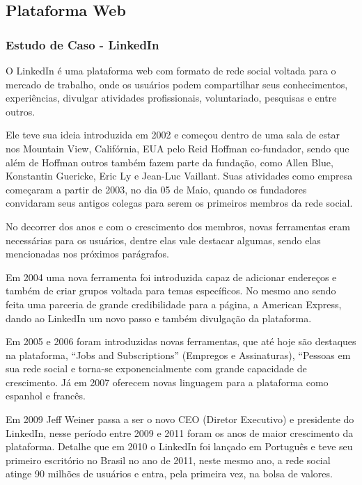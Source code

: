 \newpage

\subsection{Plataforma Web}

\subsubsection{Estudo de Caso - LinkedIn}

O LinkedIn é uma plataforma web com formato de rede social voltada para o mercado de trabalho, onde os usuários podem compartilhar seus conhecimentos, experiências, divulgar atividades profissionais, voluntariado, pesquisas e entre outros. 

Ele teve sua ideia introduzida em 2002 e começou dentro de uma sala de estar nos Mountain View, Califórnia, EUA pelo Reid Hoffman co-fundador, sendo que além de Hoffman outros também fazem parte da fundação, como Allen Blue, Konstantin Guericke, Eric Ly e Jean-Luc Vaillant. Suas atividades como empresa começaram a partir de 2003, no dia 05 de Maio, quando os fundadores convidaram seus antigos colegas para serem os primeiros membros da rede social.

No decorrer dos anos e com o crescimento dos membros, novas ferramentas eram necessárias para os usuários, dentre elas vale destacar algumas, sendo elas mencionadas nos próximos parágrafos.

Em 2004 uma nova ferramenta foi introduzida capaz de adicionar endereços e também de criar grupos voltada para temas específicos. No mesmo ano sendo feita uma parceria de grande credibilidade para a página, a American Express, dando ao LinkedIn um novo passo e também divulgação da plataforma. 

Em 2005 e 2006 foram introduzidas novas ferramentas, que até hoje são destaques na plataforma, “Jobs and Subscriptions” (Empregos e Assinaturas), “Pessoas em sua rede social e torna-se exponencialmente com grande capacidade de crescimento. Já em 2007 oferecem novas linguagem para a plataforma como espanhol e francês.

Em 2009 Jeff Weiner passa a ser o novo CEO (Diretor Executivo) e presidente do LinkedIn, nesse período entre 2009 e 2011 foram os anos de maior crescimento da plataforma. Detalhe que em 2010 o LinkedIn foi lançado em Português e teve seu primeiro escritório no Brasil no ano de 2011, neste mesmo ano, a rede social atinge 90 milhões de usuários e entra, pela primeira vez, na bolsa de valores.

